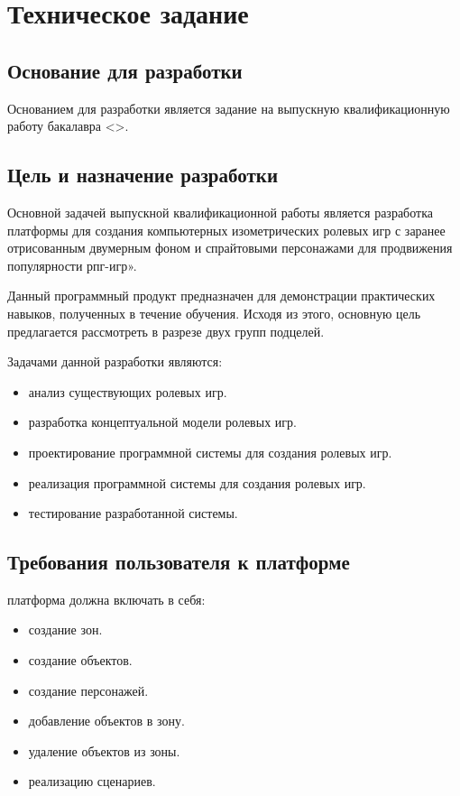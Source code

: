 \section{Техническое задание}
\subsection{Основание для разработки}

Основанием для разработки является задание на выпускную квалификационную работу бакалавра < >.

\subsection{Цель и назначение разработки}

Основной задачей выпускной квалификационной работы является разработка платформы для создания компьютерных изометрических ролевых игр с заранее отрисованным двумерным фоном и спрайтовыми персонажами для продвижения популярности рпг-игр».

Данный программный продукт предназначен для демонстрации практических навыков, полученных в течение обучения. Исходя из этого, основную цель предлагается рассмотреть в разрезе двух групп подцелей.

Задачами данной разработки являются:
\begin{itemize}
\item анализ существующих ролевых игр.
\item разработка концептуальной модели ролевых игр.
\item проектирование программной системы для создания ролевых игр.
\item реализация программной системы для создания ролевых игр.
\item тестирование разработанной системы.
\end{itemize}

\subsection{Требования пользователя к платформе}

платформа должна включать в себя:
\begin{itemize}
    \item создание зон.
    \item создание объектов.
    \item создание персонажей.
    \item добавление объектов в зону.
    \item удаление объектов из зоны.
    \item реализацию сценариев.
\end{itemize}

